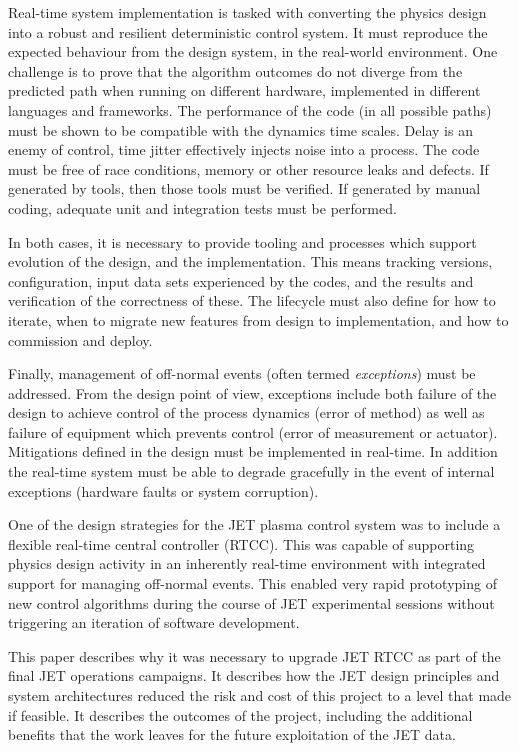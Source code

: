 \documentclass[preprint]{elsarticle}
\begin{document}
Real-time system implementation is tasked with converting the physics design
into a robust and resilient deterministic control system.  It must reproduce
the expected behaviour from the design system, in the real-world environment.
One challenge is to prove that the algorithm outcomes do not diverge from
the predicted path when running on different hardware, implemented in different
languages and frameworks. The performance of the code (in all possible paths) 
must be shown to be compatible with the dynamics time scales.  Delay is an enemy of 
control, time jitter effectively injects noise into a process.
The code must be free of race conditions, memory or other resource leaks
and defects.  If generated by tools, then those tools must be verified.
If generated by manual coding, adequate unit and integration tests must
be performed. 

In both cases, it is necessary to provide tooling and processes which support
evolution of the design, and the implementation.  This means tracking versions,
configuration, input data sets experienced by the codes, and the results and
verification of the correctness of these.  The lifecycle must also define
for how to iterate, when to migrate new features from design to implementation,
and how to commission and deploy.

Finally, management of off-normal events (often termed {\em exceptions}) 
must be addressed.  From the design point of view, exceptions include both
failure of the design to achieve control of the process dynamics (error of method)
as well as failure of equipment which prevents control (error of measurement or actuator).
Mitigations defined in the design must be implemented in real-time.  In addition
the real-time system must be able to degrade gracefully in the event of internal
exceptions (hardware faults or system corruption).

One of the design strategies for the JET plasma control system was to include
a flexible real-time central controller (RTCC). This was capable of 
supporting physics design activity in an inherently real-time environment
with integrated support for managing off-normal events.
This enabled very rapid prototyping of new control
algorithms during the course of JET experimental sessions
without triggering an iteration of software development.

This paper describes why it was necessary to upgrade JET RTCC as part of the
final JET operations campaigns.  It describes how the JET design principles
and system architectures reduced the risk and cost of this project to a 
level that made if feasible.  It describes the outcomes of the project, 
including the additional benefits that the work leaves for the future
exploitation of the JET data.
\end{document}
